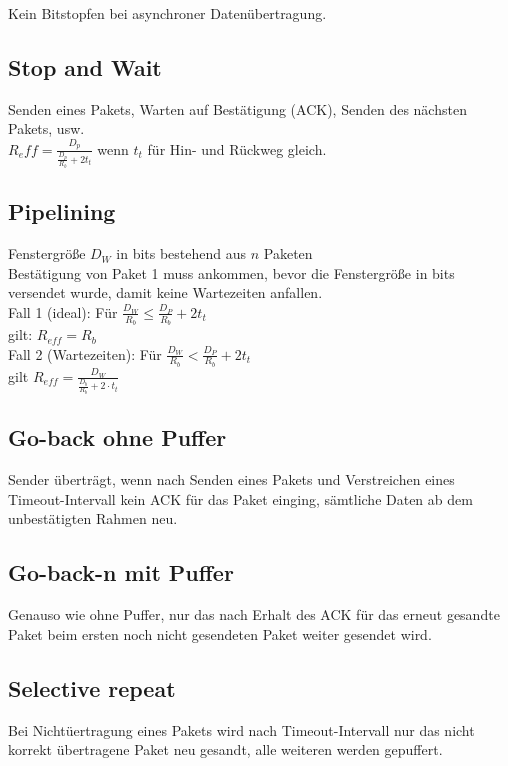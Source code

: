\documentclass[fs, footer]{latex4ei}
\begin{document}
\begin{multicols*}{4}
{	Kein Bitstopfen bei asynchroner Datenübertragung. \\
	
	\subsection{Stop and Wait} 
		Senden eines Pakets, Warten auf Bestätigung (ACK), Senden des nächsten Pakets, usw. \\
		$R_eff = \frac{D_p}{\frac{D_p}{R_b} + 2 t_t}$ wenn $t_t$ für Hin- und Rückweg gleich. \\

	\subsection{Pipelining} 
		Fenstergröße $D_W$ in bits bestehend aus $n$ Paketen\\

		Bestätigung von Paket 1 muss ankommen, bevor die Fenstergröße in bits versendet wurde, damit keine Wartezeiten anfallen. \\


		Fall 1 (ideal): Für $\frac{D_W}{R_b}  \le \frac{D_P}{R_b} + 2t_t$ \\ gilt: $R_{eff} = R_b$ \\
		Fall 2 (Wartezeiten): Für $\frac{D_W}{R_b} < \frac{D_P}{R_b} + 2t_t$  \\ gilt $R_{eff} = \frac{D_W}{\frac{D_b}{R_b} + 2 \cdot t_t }$ \\ 
	

	\subsection{Go-back ohne Puffer} 
		Sender überträgt, wenn nach Senden eines Pakets und Verstreichen eines Timeout-Intervall kein ACK für das Paket einging, sämtliche Daten ab dem unbestätigten Rahmen neu. \\

	\subsection{Go-back-n mit Puffer} 
		Genauso wie ohne Puffer, nur das nach Erhalt des ACK für das erneut gesandte Paket beim ersten noch nicht gesendeten Paket weiter gesendet wird. \\
	
	\subsection{Selective repeat}
		Bei Nichtüertragung eines Pakets wird nach Timeout-Intervall nur das nicht korrekt übertragene Paket neu gesandt, alle weiteren werden gepuffert. \\
	
}
\end{multicols*}
\end{document}
